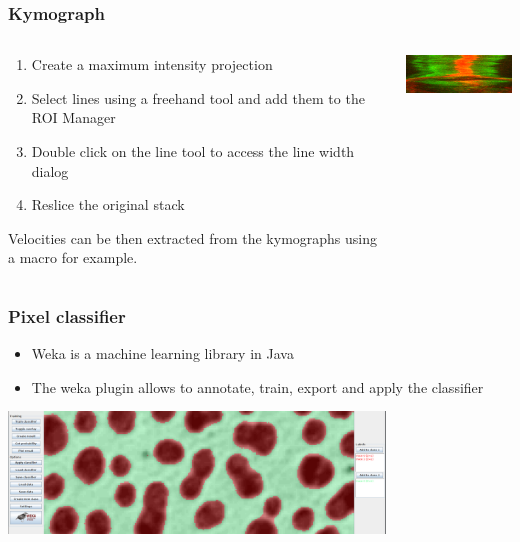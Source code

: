 \documentclass[ignorenonframetext,aspectratio=169,10pt,xcolor=table]{beamer}
\begin{document}
\begin{frame} \frametitle{Kymograph}
  \begin{columns}
    \begin{column}{0.5\textwidth}
      \begin{enumerate}
      \item Create a maximum intensity projection
      \item Select lines using a freehand tool and add them to the ROI
        Manager
      \item Double click on the line tool to access the line width
        dialog
      \item Reslice the original stack
      \end{enumerate} Velocities can be then extracted from the
      kymographs using a macro for example.
    \end{column}
    \begin{column}{0.5\textwidth}
      \includegraphics[width=\textwidth]{kymo_mito}
    \end{column}
  \end{columns}
\end{frame}

\begin{frame} \frametitle{Pixel classifier}
  \begin{itemize}
  \item Weka is a machine learning library in Java
  \item The weka plugin allows to annotate, train, export and apply
    the classifier
  \end{itemize}
  \begin{center} \includegraphics[width=0.75\textwidth]{weka}
  \end{center}
\end{frame}
\end{document}
